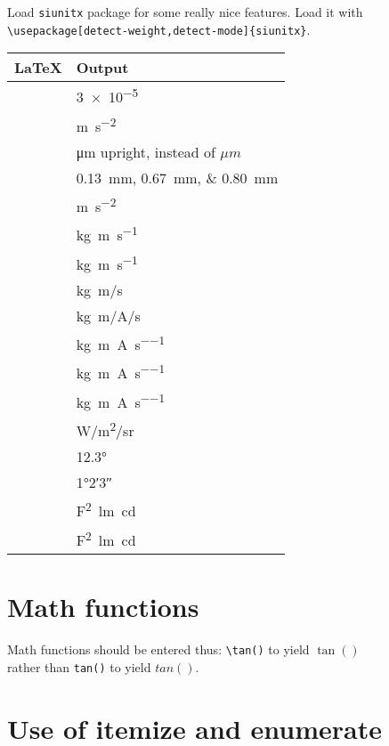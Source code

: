 \documentclass[english]{workpackage}[1996/06/02]
\begin{document}
Load \verb+siunitx+  package for  some really nice features. Load it with \\
\verb+\usepackage[detect-weight,detect-mode]{siunitx}+.

\newcommand{\tabentry}[1]{\detokenize{#1} & #1}

\begin{tabular}{p{110mm}|l}
\textbf{\LaTeX{}} & \textbf{Output}\\\hline
\tabentry{\num{3e-5}}\\
\tabentry{\si{\metre\per\second\squared}}\\
\tabentry{\si{\micro\metre}} upright,  instead of $\mu m$\\
\tabentry{\SIlist{0.13;0.67;0.80}{\milli\metre}}\\
\tabentry{\si{\metre\per\second\squared}}\\
\tabentry{\si{kg.m.s^{-1}}}\\
\tabentry{\si{\kilogram\metre\per\second}}\\
\tabentry{\si[per-mode=symbol]{\kilogram\metre\per\second}}\\
\tabentry{\si[per-mode=symbol]{\kilogram\metre\per\ampere\per\second}}\\
\tabentry{\si[per-mode=reciprocal]{\kilogram\metre\per\ampere\per\second}}\\
\tabentry{\si{\kilogram\metre\per\ampere\per\second}}\\
\tabentry{\si[per-mode=fraction]{\kilogram\metre\per\ampere\per\second}}\\
\tabentry{\si[per-mode=symbol]{\watt\per\metre\squared\per \steradian}}\\
\tabentry{\ang{12.3}}\\
\tabentry{\ang{1;2;3}}\\
\tabentry{\si{\farad\squared\lumen\candela}}\\
\tabentry{\si[inter-unit-product = \ensuremath{{}\cdot{}}]{\farad\squared\lumen\candela}}\\
\end{tabular}
\section{Math functions}
\label{sec:Mathfunctions}

Math functions should be entered thus: \verb+\tan()+ to yield $\tan()$ \\
rather than \verb+tan()+ to yield $tan()$.

\section{Use of itemize and enumerate}
\label{sec:Useofitemizeandenumerate}
\end{document}
